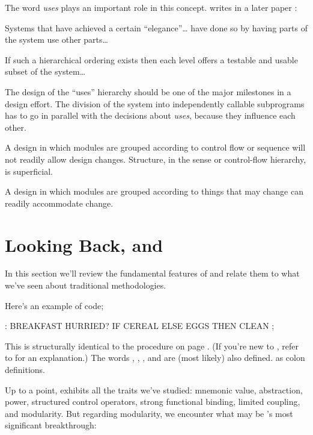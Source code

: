 The word \emph{uses} plays an important role in this concept.
%
writes in a later paper \cite{parnas79}:

\begin{tfquot}
Systems that have achieved a certain ``elegance''\dots{} have done so
by having parts of the system use other parts\dots{}

If such a hierarchical ordering exists then each level offers a
testable and usable subset of the system\dots{}

The design of the ``uses'' hierarchy should be one of the major
milestones in a design effort. The division of the system into
independently callable subprograms has to go in parallel with the
decisions about \emph{uses}, because they influence each other.
\end{tfquot}
A design in which modules are grouped according to control flow or
sequence will not readily allow design changes. Structure, in the
sense or control-flow hierarchy, is superficial.

A design in which modules are grouped according to things that may
change can readily accommodate change.%
%


\section{Looking Back, and \Forth{}}%
In this section we'll review the fundamental features of \Forth{} and
relate them to what we've seen about traditional methodologies.

Here's an example of \Forth{} code;
\begin{Code}
: BREAKFAST
   HURRIED?  IF  CEREAL  ELSE  EGGS  THEN CLEAN ;
\end{Code}
This is structurally identical to the procedure  on
page \pageref{fig-fig1-4}. (If you're new to \Forth{}, refer to
 for an explanation.)  The words ,
, , and  are (most likely) also
defined. as colon definitions.

Up to a point, \Forth{} exhibits all the traits we've studied: mnemonic
value, abstraction, power, structured control operators, strong
functional binding, limited coupling, and modularity. But regarding
modularity, we encounter what may be \Forth{}'s most significant
breakthrough:

